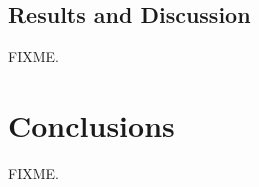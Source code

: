 \subsection{Results and Discussion}

\begin{doublespace}
FIXME.
\end{doublespace}

\section{Conclusions}

\begin{doublespace}
FIXME.
\end{doublespace}




